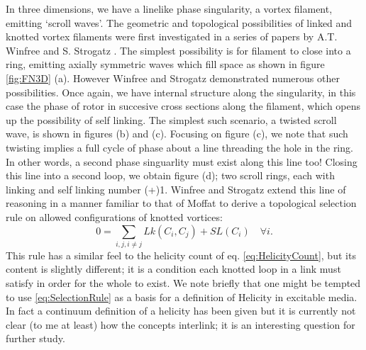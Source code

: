 In three dimensions, we have a linelike phase singularity, a vortex filament, emitting `scroll waves'. The geometric and topological possibilities of linked and knotted vortex filaments were first investigated in a series of papers by A.T. Winfree and S. Strogatz \cite{}. The simplest possibility is for filament to close into a ring, emitting axially symmetric waves which fill space as shown in figure \ref{fig:FN3D} (a). However Winfree and Strogatz demonstrated numerous other possibilities. Once again, we have internal structure along the singularity, in this case the phase of rotor in succesive cross sections along the filament, which opens up the possibility of self linking. The simplest such scenario, a twisted scroll wave, is shown in figures (b) and (c). Focusing on figure (c), we note that such twisting implies a full cycle of phase about a line threading the hole in the ring. In other words, a second phase singuarlity must exist along this line too! Closing this line into a second loop, we obtain figure (d); two scroll rings, each with linking and self linking number (+)1. Winfree and Strogatz extend this line of reasoning in a manner familiar to that of Moffat \cite{} to derive a topological selection rule on allowed configurations of knotted vortices: 
\begin{equation}
    0 = \sum_{i,j, i\neq j} Lk(C_i,C_j) + SL(C_i) \quad \forall i. 
    \label{eq:SelectionRule}
\end{equation}
This rule has a similar feel to the helicity count of eq. \ref{eq:HelicityCount}, but its content is slightly different; it is a condition each knotted loop in a link must satisfy in order for the whole to exist. We note briefly that one might be tempted to use \ref{eq:SelectionRule} as a basis for a definition of Helicity in excitable media. In fact a continuum definition of a helicity has been given \cite{Arrayas} but it is currently not clear (to me at least) 
how the concepts interlink; it is an interesting question for further study.

